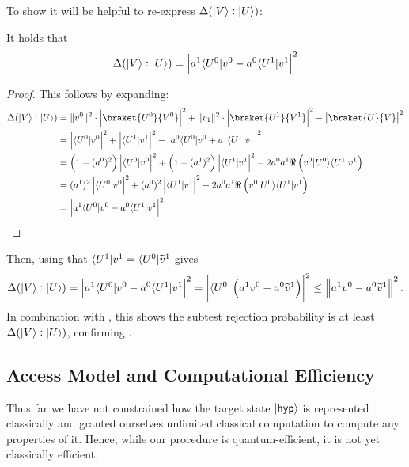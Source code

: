     To show  it will be helpful to re-express $\Delta(\lvert V\rangle : \lvert U\rangle)$:
    \begin{proposition}
        It holds that
        \[
            \Delta(\lvert V\rangle : \lvert U\rangle) = \left|a^1 \langle U^0\rvert v^0 - a^0 \langle U^1\rvert v^1\right|^2
        \]
    \end{proposition}
    \begin{proof}
        This follows by expanding:
        \begin{align*}
            \Delta(\ket{V} : \ket{U}) &= \|v^0\|^2 \cdot \left|\braket{U^0}{V^0}\right|^2 + \|v_1\|^2 \cdot \left|\braket{U^1}{V^1}\right|^2  
            - \left|\braket{U}{V}\right|^2 \\
            &= \left|\bra{U^0}v^0\right|^2 + \left|\bra{U^1}v^1\right|^2 - \left|a^0 \bra{U^0}v^0 + a^1 \bra{U^1}v^1\right|^2 \\
            &= \left( 1- (a^0)^2 \right) \left|\bra{U^0}v^0\right|^2 + \left( 1- (a^1)^2 \right) \left|\bra{U^1}v^1\right|^2 - 2a^0a^1\Re \left( v^0\ket{U^0}\bra{U^1}v^1 \right) \\
            &= (a^1)^2\left|\bra{U^0}v^0\right|^2 + (a^0)^2 \left|\bra{U^1}v^1\right|^2 - 2a^0a^1\Re \left( v^0\ket{U^0}\bra{U^1}v^1 \right) \\
            &=\left|a^1 \bra{U^0}v^0 - a^0 \bra{U^1}v^1\right|^2 \qedhere
        \end{align*}
    \end{proof}
    Then, using that $\langle U^1\rvert v^1 = \langle U^0\rvert\widetilde{v}^1$ gives
    \[
        \Delta(\lvert V\rangle : \lvert U\rangle) = \left|a^1 \langle U^0\rvert v^0 - a^0 \langle U^1\rvert v^1\right|^2 = \left|\langle U^0\rvert\left(a^1 v^0-a^0 \widetilde{v}^1\right)\right|^2 \leq \left\|a^1 v^0 - a^0 \widetilde{v}^1\right\|^2.
    \]
    In combination with , this shows the subtest rejection probability is at least $\Delta(\lvert V\rangle : \lvert U\rangle)$, confirming .




\subsection{Access Model and Computational Efficiency}\label{sec:access model}
Thus far we have not constrained how the target state $\lvert\mathsf{hyp}\rangle$ is represented classically and granted ourselves unlimited classical computation to compute any properties of it. Hence, while our procedure is quantum-efficient, it is not yet classically efficient.

